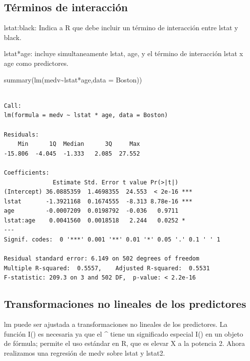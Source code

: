 \documentclass[
  letterpaper,
  DIV=11,
  numbers=noendperiod]{scrartcl}
\newenvironment{Shaded}{\begin{snugshade}}{\end{snugshade}}
\newcommand{\AttributeTok}[1]{\textcolor[rgb]{0.40,0.45,0.13}{#1}}
\newcommand{\FunctionTok}[1]{\textcolor[rgb]{0.28,0.35,0.67}{#1}}
\newcommand{\NormalTok}[1]{\textcolor[rgb]{0.00,0.23,0.31}{#1}}
\newcommand{\SpecialCharTok}[1]{\textcolor[rgb]{0.37,0.37,0.37}{#1}}
\begin{document}
\hypertarget{tuxe9rminos-de-interacciuxf3n}{%
\subsection{Términos de
interacción}\label{tuxe9rminos-de-interacciuxf3n}}

lstat:black: Indica a R que debe incluir un término de interacción entre
lstat y black.

lstat*age: incluye simultaneamente lstat, age, y el término de
interacción lstat x age como predictores.

\begin{Shaded}
\begin{Highlighting}[]
\FunctionTok{summary}\NormalTok{(}\FunctionTok{lm}\NormalTok{(medv}\SpecialCharTok{\textasciitilde{}}\NormalTok{lstat}\SpecialCharTok{*}\NormalTok{age,}\AttributeTok{data =}\NormalTok{ Boston))}
\end{Highlighting}
\end{Shaded}

\begin{verbatim}

Call:
lm(formula = medv ~ lstat * age, data = Boston)

Residuals:
    Min      1Q  Median      3Q     Max 
-15.806  -4.045  -1.333   2.085  27.552 

Coefficients:
              Estimate Std. Error t value Pr(>|t|)    
(Intercept) 36.0885359  1.4698355  24.553  < 2e-16 ***
lstat       -1.3921168  0.1674555  -8.313 8.78e-16 ***
age         -0.0007209  0.0198792  -0.036   0.9711    
lstat:age    0.0041560  0.0018518   2.244   0.0252 *  
---
Signif. codes:  0 '***' 0.001 '**' 0.01 '*' 0.05 '.' 0.1 ' ' 1

Residual standard error: 6.149 on 502 degrees of freedom
Multiple R-squared:  0.5557,    Adjusted R-squared:  0.5531 
F-statistic: 209.3 on 3 and 502 DF,  p-value: < 2.2e-16
\end{verbatim}

\hypertarget{transformaciones-no-lineales-de-los-predictores}{%
\subsection{Transformaciones no lineales de los
predictores}\label{transformaciones-no-lineales-de-los-predictores}}

lm puede ser ajustada a transformaciones no lineales de los predictores.
La función I() es necesaria ya que el \^{} tiene un significado especial
I() en un objeto de fórmula; permite el uso estándar en R, que es elevar
X a la potencia 2. Ahora realizamos una regresión de medv sobre lstat y
lstat2.
\end{document}
